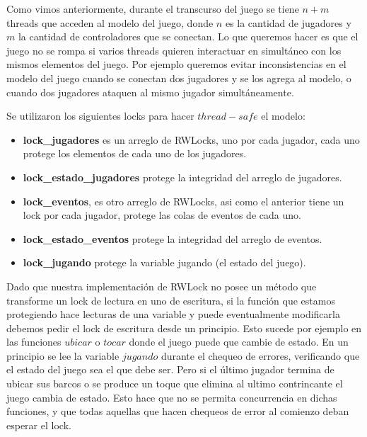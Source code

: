 Como vimos anteriormente, durante el transcurso del juego se tiene $n + m$ threads que acceden al modelo del juego, donde $n$ es la cantidad de jugadores y $m$ la cantidad de controladores que se conectan. 
Lo que queremos hacer es que el juego no se rompa si varios threads quieren interactuar en simultáneo con los mismos elementos del juego. Por ejemplo queremos evitar inconsistencias en el modelo del juego cuando se conectan dos jugadores y se los agrega al modelo, o cuando dos jugadores ataquen al mismo jugador simultáneamente.

Se utilizaron los siguientes locks para hacer $thread-safe$ el modelo:
\begin{itemize}
	\item	\textbf{lock\_jugadores} es un arreglo de RWLocks, uno por cada jugador, cada uno protege los elementos de cada uno de los jugadores.
	\item	\textbf{lock\_estado\_jugadores} protege la integridad del arreglo de jugadores.
	\item	\textbf{lock\_eventos}, es otro arreglo de RWLocks, asi como el anterior tiene un lock por cada jugador, protege las colas de eventos de cada uno.
	\item	\textbf{lock\_estado\_eventos} protege la integridad del arreglo de eventos.
	\item	\textbf{lock\_jugando} protege la variable jugando (el estado del juego).
\end{itemize}

Dado que nuestra implementación de RWLock no posee un método que transforme un lock de lectura en uno de escritura, si la función que estamos protegiendo hace lecturas de una variable y puede eventualmente modificarla debemos pedir el lock de escritura desde un principio. Esto sucede por ejemplo en las funciones $ubicar$ o $tocar$ donde el juego puede que cambie de estado. En un principio se lee la variable $jugando$ durante el chequeo de errores, verificando que el estado del juego sea el que debe ser. Pero si el último jugador termina de ubicar sus barcos o se produce un toque que elimina al ultimo contrincante el juego cambia de estado. Esto hace que no se permita concurrencia en dichas funciones, y que todas aquellas que hacen chequeos de error al comienzo deban esperar el lock.
